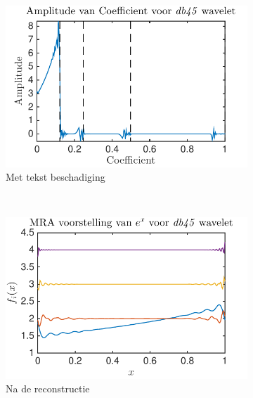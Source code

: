 \begin{figure}
\begin{subfigure}[b]{0.45\textwidth}
        \includegraphics[width=\textwidth]{../src/denoising/db45_noNoise/coef_exp_db45_3}
        \caption{Met tekst beschadiging}
        \label{fig:tiger}
    \end{subfigure}
    ~ %
    \begin{subfigure}[b]{0.45\textwidth}
        \includegraphics[width=\textwidth]{../src/denoising/db45_noNoise/MRA_exp_db45_3}
        \caption{Na de reconstructie}
        \label{fig:mouse}
    \end{subfigure}
    \begin{subfigure}[b]{0.45\textwidth}

\end{subfigure}
\end{figure}
